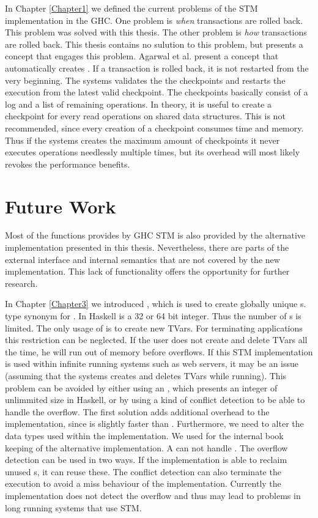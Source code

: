 In Chapter \ref{Chapter1} we defined the current problems of the STM implementation in the GHC. One problem
is \textit{when} transactions are rolled back. This problem was solved with this thesis. The other problem is
\textit{how} transactions are rolled back. This thesis contains no sulution to this problem, but \parencite{checkpoint}
presents a concept that engages this problem. Agarwal et al. present a concept that automatically creates 
. If a transaction is rolled back, it is not restarted from the very beginning. The 
systems validates the the checkpoints and restarts the execution from the latest valid checkpoint.
The checkpoints basically consist of a log and a list of remaining operations. In theory, it is useful
to create a checkpoint for every read operations on shared data structures. This is not recommended, since
every creation of a checkpoint consumes time and memory. Thus if the systems creates the maximum amount 
of checkpoints it never executes operations needlessly multiple times, but its overhead will
most likely revokes the performance benefits.

\section{Future Work}
Most of the functions provides by GHC STM is also provided by the alternative implementation presented in
this thesis. Nevertheless, there are parts of the external interface and internal semantics that are not 
covered by the new implementation. This lack of functionality offers the opportunity for further research.

In Chapter \ref{Chapter3} we introduced , which is used to create globally unique 
s.  type synonym for . In Haskell  is a 32 or 64 bit integer. Thus 
the number of s is limited. The only usage of  is to create new TVars. For terminating 
applications this restriction can be neglected. If the user does not create and delete TVars all the time,
he will run out of memory before  overflows. If this STM implementation is used within
infinite running systems such as web servers, it may be an issue (assuming that the systems creates and
deletes TVars while running). This problem can be avoided by either using an , which presents
an integer of unlimmited size in Haskell, or by using a kind of conflict detection to be able to handle the 
overflow. The first solution adds additional overhead to the implementation, since  is slightly 
faster than . Furthermore, we need to alter the data types used within the implementation. 
We used  for the internal book keeping of the alternative implementation. A  can
not handle . The overflow detection can be used in two ways. If the implementation is able 
to reclaim unused s, it can reuse these. The conflict detection can also terminate the execution to 
avoid a miss behaviour of the implementation. Currently the implementation does not detect the overflow 
and thus may lead to problems in long running systems that use STM.

